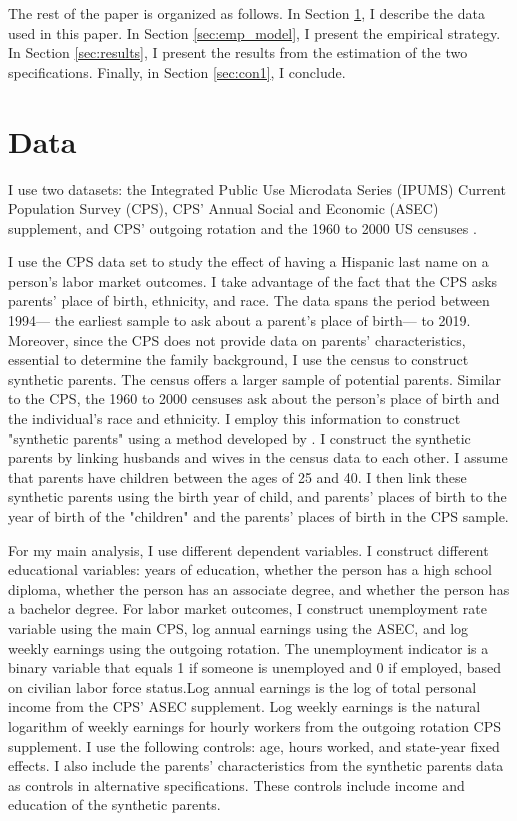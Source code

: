 The rest of the paper is organized as follows. In Section \ref{sec:data}, I describe the data used in this paper. In Section \ref{sec:emp_model}, I present the empirical strategy. In Section \ref{sec:results}, I present the results from the estimation of the two specifications. Finally, in Section \ref{sec:con1}, I conclude.

\section{Data}\label{sec:data}

I use two datasets:  the Integrated Public Use Microdata Series (IPUMS) Current Population Survey (CPS), CPS' Annual Social and Economic (ASEC) supplement, and CPS' outgoing rotation \autocite{cps2019} and the 1960 to 2000 US censuses \autocite{acs2019}. 

I use the CPS data set to study the effect of having a Hispanic last name on a person's labor market outcomes. I take advantage of the fact that the CPS asks parents' place of birth, ethnicity, and race. The data spans the period between 1994--- the earliest sample to ask about a parent's place of birth--- to 2019. Moreover, since the CPS does not provide data on parents' characteristics, essential to determine the family background, I use the census to construct synthetic parents. The census offers a larger sample of potential parents. Similar to the CPS, the 1960 to 2000 censuses ask about the person's place of birth and the individual's race and ethnicity. I employ this information to construct "synthetic parents" using a method developed by \textcite{rubinstein2014pride}. I construct the synthetic parents by linking husbands and wives in the census data to each other. I assume that parents have children between the ages of 25 and 40. I then link these synthetic parents using the birth year of child, and parents' places of birth to the year of birth of the "children" and the parents' places of birth in the CPS sample.

For my main analysis, I use different dependent variables. I construct different educational variables: years of education, whether the person has a high school diploma, whether the person has an associate degree, and whether the person has a bachelor degree. For labor market outcomes, I construct unemployment rate variable using the main CPS, log annual earnings using the ASEC, and log weekly earnings using the outgoing rotation. The unemployment indicator is a binary variable that equals 1 if someone is unemployed and 0 if employed, based on civilian labor force status.Log annual earnings is the log of total personal income from the CPS' ASEC supplement. Log weekly earnings is the natural logarithm of weekly earnings for hourly workers from the outgoing rotation CPS supplement. I use the following controls: age, hours worked, and state-year fixed effects. I also include the parents' characteristics from the synthetic parents data as controls in alternative specifications. These controls include income and education of the synthetic parents.

